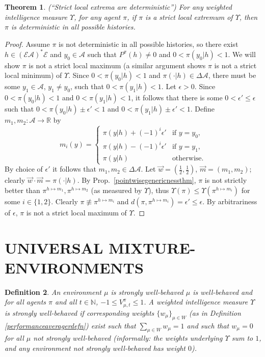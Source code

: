 \documentclass[twoside]{article}
\newtheorem{theorem}{Theorem}
\newtheorem{definition}[theorem]{Definition}
\begin{document}
\begin{theorem}
\label{extremitythm}
    (``Strict local extrema are deterministic'')
    For any weighted intelligence measure $\Upsilon$, for any agent $\pi$,
    if $\pi$ is a strict local extremum of $\Upsilon$, then
    $\pi$ is deterministic in all possible histories.
\end{theorem}

\begin{proof}
    Assume $\pi$ is not deterministic in all possible histories, so there exist
    $h\in(\mathcal E\mathcal A)^*\mathcal E$ and $y_0\in\mathcal A$
    such that $P^\pi(h)\not=0$ and $0<\pi(y_0|h)<1$.
    We will show $\pi$ is not a strict local maximum (a similar argument
    shows $\pi$ is not a strict local minimum) of $\Upsilon$.
    Since $0<\pi(y_0|h)<1$ and $\pi(\cdot|h)\in\Delta\mathcal A$,
    there must be some $y_1\in\mathcal A$, $y_1\not=y_0$, such that
    $0<\pi(y_1|h)<1$. Let $\epsilon>0$.
    Since $0<\pi(y_0|h)<1$ and $0<\pi(y_1|h)<1$, it follows
    that there is some $0<\epsilon'\leq \epsilon$
    such that $0<\pi(y_0|h)\pm\epsilon'<1$ and $0<\pi(y_1|h)\pm\epsilon'<1$.
    Define $m_1,m_2:\mathcal A\to \mathbb R$ by
    \[
        m_i(y) = \begin{cases}
            \pi(y|h)+(-1)^i\epsilon' &\mbox{if $y=y_0$,}\\
            \pi(y|h)-(-1)^i\epsilon' &\mbox{if $y=y_1$,}\\
            \pi(y|h) &\mbox{otherwise.}
        \end{cases}
    \]
    By choice of $\epsilon'$ it follows that $m_1,m_2\in\Delta\mathcal A$.
    Let $\vec w=(\frac12,\frac12)$, $\vec m=(m_1,m_2)$;
    clearly $\vec w\cdot\vec m=\pi(\cdot|h)$.
    By Prop.\ \ref{pointwisegenericnessthm},
    $\pi$ is not strictly better than $\pi^{h\mapsto m_1},\pi^{h\mapsto m_2}$
    (as measured by $\Upsilon$),
    thus $\Upsilon(\pi)\leq \Upsilon(\pi^{h\mapsto m_i})$
    for some $i\in\{1,2\}$.
    Clearly $\pi\not\equiv \pi^{h\mapsto m_i}$
    and $d(\pi,\pi^{h\mapsto m_i})=\epsilon'\leq\epsilon$.
    By arbitrariness of $\epsilon$,
    $\pi$ is not a strict local maximum of $\Upsilon$.
\end{proof}

\section{UNIVERSAL MIXTURE-ENVIRONMENTS}

\begin{definition}
\label{stronglywellbehaveddefn}
    An environment $\mu$ is \emph{strongly well-behaved}
    $\mu$ is well-behaved and for all agents $\pi$ and all
    $t\in\mathbb N$, $-1\leq V^\pi_{\mu,t}\leq 1$.
    A weighted intelligence measure $\Upsilon$ is \emph{strongly well-behaved}
    if corresponding weights $\{w_\mu\}_{\mu\in W}$
    (as in Definition \ref{performanceaveragerdefn}) exist such that
    $\sum_{\mu\in W}w_\mu=1$ and such that
    $w_\mu=0$ for all $\mu$ not strongly well-behaved (informally: the weights
    underlying $\Upsilon$ sum to $1$, and any environment not strongly
    well-behaved has weight $0$).
\end{definition}
\end{document}
